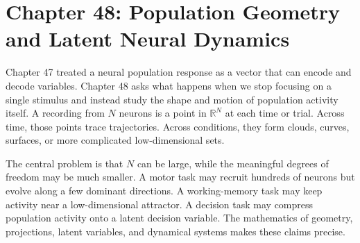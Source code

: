 \section{Chapter 48: Population Geometry and Latent Neural Dynamics}
\label{ch:population-geometry-latent-neural-dynamics}

Chapter 47 treated a neural population response as a vector that can encode and decode variables. Chapter 48 asks what happens when we stop focusing on a single stimulus and instead study the shape and motion of population activity itself. A recording from \(N\) neurons is a point in \(\mathbb R^N\) at each time or trial. Across time, those points trace trajectories. Across conditions, they form clouds, curves, surfaces, or more complicated low-dimensional sets.

The central problem is that \(N\) can be large, while the meaningful degrees of freedom may be much smaller. A motor task may recruit hundreds of neurons but evolve along a few dominant directions. A working-memory task may keep activity near a low-dimensional attractor. A decision task may compress population activity onto a latent decision variable. The mathematics of geometry, projections, latent variables, and dynamical systems makes these claims precise.

